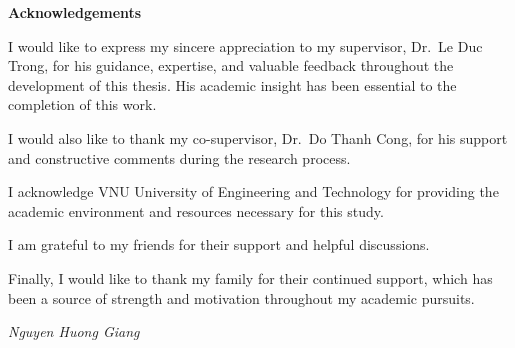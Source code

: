 \begin{center}
\textbf{\large{Acknowledgements}}
\end{center}


I would like to express my sincere appreciation to my supervisor, Dr.\ Le Duc Trong, for his guidance, expertise, and valuable feedback throughout the development of this thesis. His academic insight has been essential to the completion of this work.

I would also like to thank my co-supervisor, Dr.\ Do Thanh Cong, for his support and constructive comments during the research process.

I acknowledge VNU University of Engineering and Technology for providing the academic environment and resources necessary for this study.

I am grateful to my friends for their support and helpful discussions.

Finally, I would like to thank my family for their continued support, which has been a source of strength and motivation throughout my academic pursuits.

\hfill

\textit{Nguyen Huong Giang}
